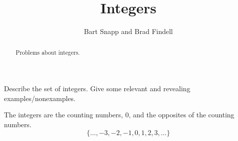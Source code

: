 \documentclass[nooutcomes]{ximera}
\title{Integers}
\author{Bart Snapp and Brad Findell}
\begin{document}
\begin{abstract}
Problems about integers.
\end{abstract}
\maketitle




\begin{problem}
Describe the set of integers. Give some relevant and revealing
  examples/nonexamples.
\begin{freeResponse}
\begin{hint}
The integers are the counting numbers, 0, and the opposites of the counting numbers.  
\[\{ \dots, -3, -2, -1, 0, 1, 2, 3, \dots\}\]
\end{hint}
\end{freeResponse}
\end{problem}

%
%
\end{document}
